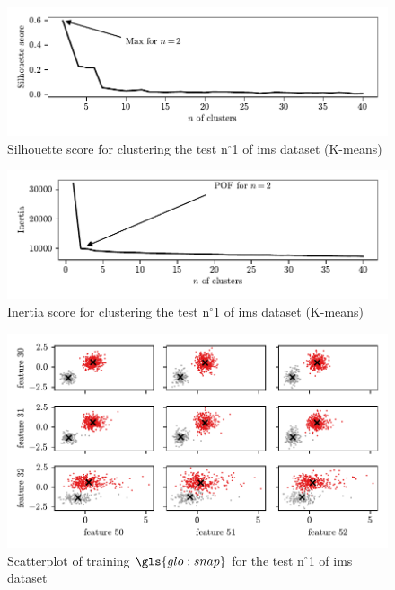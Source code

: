 \begin{figure}
    \centering
    \includegraphics{images/IMS/SilScore_01.pdf}
    \caption{Silhouette score for clustering the test $\text{n}^\circ$1 of \gls{ims} dataset (K-means)}
    \label{fig:SilScore_01}
\end{figure}

\begin{figure}
    \centering
    \includegraphics{images/IMS/InertiaScore_01.pdf}
    \caption{Inertia score for clustering the test $\text{n}^\circ$1 of \gls{ims} dataset (K-means)}
    \label{fig:InertiaScore_01}
\end{figure}

\begin{figure}
    \centering
    \includegraphics{images/IMS/Clusters.pdf}
    \caption{Scatterplot of training $\gls{glo:snap}$ for the test $\text{n}^\circ$1 of \gls{ims} dataset}
    \label{fig:Clusters}
\end{figure}

